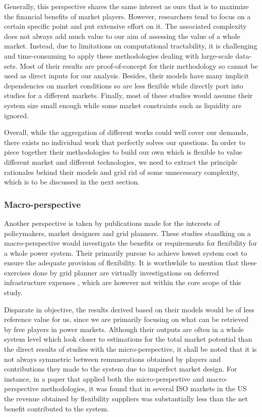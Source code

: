 Generally, this perspective shares the same interest as ours that is to maximize the financial benefits of market players. However, researchers tend to focus on a certain specific point and put extensive effort on it. The associated complexity does not always add much value to our aim of assessing the value of a whole market. Instead, due to limitations on computational tractability, it is challenging and time-consuming to apply these methodologies dealing with large-scale data-sets. Most of their results are proof-of-concept for their methodology so cannot be used as direct inputs for our analysis. Besides, their models have many implicit dependencies on market conditions so are less flexible while directly port into studies for a different markets. Finally, most of these studies would assume their system size small enough while some market constraints such as liquidity are ignored.

Overall, while the aggregation of different works could well cover our demands, there exists no individual work that perfectly solves our questions. In order to piece together their methodologies to build our own which is flexible to value different market and different technologies, we need to extract the principle rationales behind their models and grid rid of some unnecessary complexity, which is to be discussed in the next section.

\subsubsection{Macro-perspective}

Another perspective is taken by publications made for the interests of policymakers, market designers and grid planners. These studies standking on a macro-perspective would investigate the benefits or requirements for flexibility for a whole power system. Their primarily pursue to achieve lowest system cost to ensure the adequate provision of flexibility. It is worthwhile to mention that these exercises done by grid planner are virtually investigations on deferred infrastructure expenses \cite{Siano2014,HDREngineeringInc.2014,Gunter2016}, which are however not within the core scope of this study.

Disparate in objective, the results derived based on their models would be of less reference value for us, since we are primarily focusing on what can be retrieved by free players in power markets. Although their outputs are often in a whole system level which look closer to estimations for the total market potential than the direct results of studies with the micro-perspective, it shall be noted that it is not always symmetric between remunerations obtained by players and contributions they made to the system due to imperfect market design. For instance, in a paper that applied both the micro-perspective and macro-perspective methodologies, it was found that in several ISO markets in the US the revenue obtained by flexibility suppliers was substantially less than the net benefit contributed to the system\cite{Denholm2013}.

